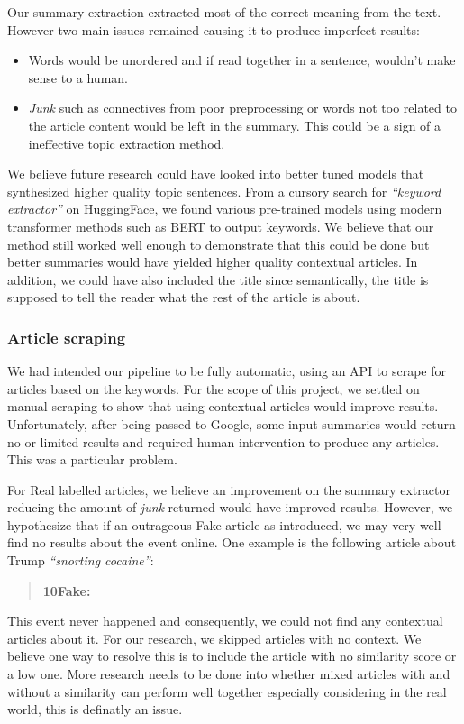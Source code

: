 \documentclass{article}
\begin{document}
Our summary extraction extracted most of the correct meaning from the text. However two main issues remained causing it to produce imperfect results:
\begin{itemize}
  \item Words would be unordered and if read together in a sentence, wouldn't make sense to a human.
  \item \emph{Junk} such as connectives from poor preprocessing or words not too related to the article content would be left in the summary. This could be a sign of a ineffective topic extraction method.
\end{itemize}

We believe future research could have looked into better tuned models that synthesized higher quality topic sentences. From a cursory search for \emph{``keyword extractor''} on HuggingFace, we found various pre-trained models using modern transformer methods such as BERT to output keywords. We believe that our method still worked well enough to demonstrate that this could be done but better summaries would have yielded higher quality contextual articles. In addition, we could have also included the title since semantically, the title is supposed to tell the reader what the rest of the article is about.

\subsubsection*{Article scraping}\label{limitation:article-scraping}

We had intended our pipeline to be fully automatic, using an API to scrape for articles based on the keywords. For the scope of this project, we settled on manual scraping to show that using contextual articles would improve results. Unfortunately, after being passed to Google, some input summaries would return no or limited results and required human intervention to produce any articles. This was a particular problem.

For Real labelled articles, we believe an improvement on the summary extractor reducing the amount of \emph{junk} returned would have improved results. However, we hypothesize that if an outrageous Fake article as introduced, we may very well find no results about the event online. One example is the following article about Trump \emph{``snorting cocaine''}:
\begin{quote}
  \textbf{10Fake:}\quad{}
\end{quote}
This event never happened and consequently, we could not find any contextual articles about it. For our research, we skipped articles with no context. We believe one way to resolve this is to include the article with no similarity score or a low one. More research needs to be done into whether mixed articles with and without a similarity can perform well together especially considering in the real world, this is definatly an issue.
\end{document}
